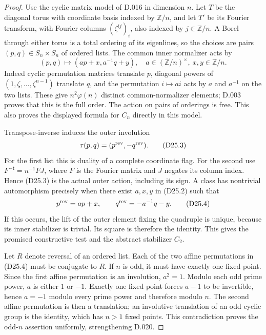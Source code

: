 \begin{proof}
Use the cyclic matrix model of D.016 in dimension $n$.
Let $T$ be the diagonal torus with coordinate basis indexed by
$\mathbb Z/n$, and let $T'$ be its Fourier transform, with Fourier
columns $(\zeta^{ij})_i$, also indexed by $j\in\mathbb Z/n$.
A Borel through either torus is a total ordering of its eigenlines,
so the choices are pairs $(p,q)\in S_n\times S_n$ of ordered lists.
The common inner normalizer acts by
\[
 (p,q)\longmapsto(ap+x,a^{-1}q+y),\quad
 a\in(\mathbb Z/n)^\times,\ x,y\in\mathbb Z/n.           \tag{D25.2}
\]
Indeed cyclic permutation matrices translate $p$, diagonal powers
of $(1,\zeta,\ldots,\zeta^{n-1})$ translate $q$, and the permutation
$i\mapsto ai$ acts by $a$ and $a^{-1}$ on the two lists.
These give $n^2\varphi(n)$ distinct common-normalizer elements;
D.003 proves that this is the full order.  The action on pairs
of orderings is free.  This also proves the displayed formula
for $C_n$ directly in this model.

Transpose-inverse induces the outer involution
\[
 \tau(p,q)=(p^{\rm rev},-q^{\rm rev}).                   \tag{D25.3}
\]
For the first list this is duality of a complete coordinate flag.
For the second use $F^{-\mathsf t}=n^{-1}FJ$, where $F$ is the
Fourier matrix and $J$ negates its column index.  Hence (D25.3)
is the actual outer action, including its sign.
A class has nontrivial automorphism precisely when there exist
$a,x,y$ in (D25.2) such that
\[
 p^{\rm rev}=ap+x,\qquad q^{\rm rev}=-a^{-1}q-y.         \tag{D25.4}
\]
If this occurs, the lift of the outer element fixing the quadruple
is unique, because its inner stabilizer is trivial.  Its square
is therefore the identity.  This gives the promised constructive
test and the abstract stabilizer $C_2$.

Let $R$ denote reversal of an ordered list.  Each of the two
affine permutations in (D25.4) must be conjugate to $R$.
If $n$ is odd, it must have exactly one fixed point.  Since the
first affine permutation is an involution, $a^2=1$.
Modulo each odd prime power, $a$ is either $1$ or $-1$.
Exactly one fixed point forces $a-1$ to be invertible, hence
$a=-1$ modulo every prime power and therefore modulo $n$.
The second affine permutation is then a translation; an
involutive translation of an odd cyclic group is the identity,
which has $n>1$ fixed points.  This contradiction proves the
odd-$n$ assertion uniformly, strengthening D.020.


\end{proof}
